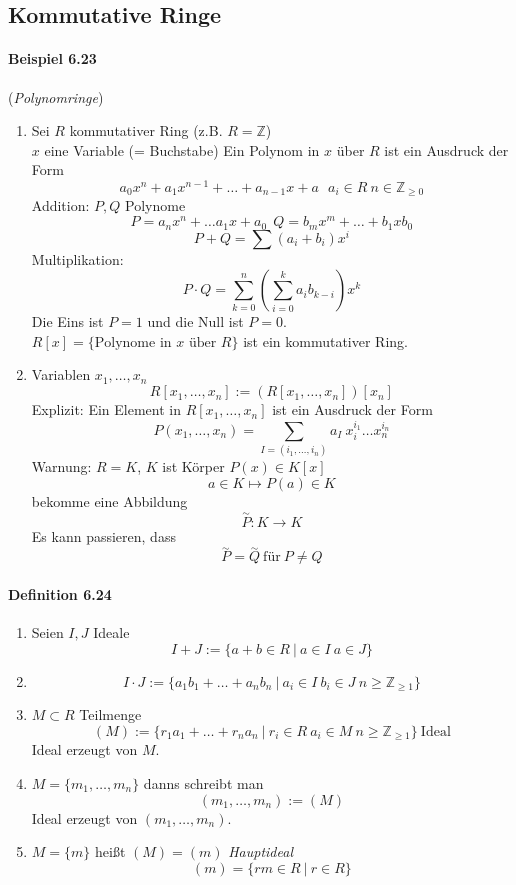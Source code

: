 \documentclass{scrartcl}
\begin{document}
\subsection{Kommutative Ringe}
\label{subsec:kommutativeringe}

\paragraph{Beispiel 6.23} (\textit{Polynomringe})
\begin{enumerate}
\item Sei $R$ kommutativer Ring (z.B. $R = \mathbb{Z}$) \\
  $x$ eine Variable (= Buchstabe)
  Ein Polynom in $x$ über $R$ ist ein Ausdruck der Form
  \[
    a_0x^n + a_1x^{n-1} + \dots + a_{n-1}x + a~~~a_i \in R~n \in
    \mathbb{Z}_{\geq 0}
  \]
  Addition: $P, Q$ Polynome
  \[
    P = a_nx^n + \dots a_{1}x+a_0 ~~
    Q = b_mx^m + \dots + b_{1}xb_0
  \]
  \[
     P + Q = \sum (a_i + b_i)x^i
   \]
   Multiplikation:
   \[
     P \cdot Q = \sum_{k = 0}^n \left( \sum_{i = 0}^k a_ib_{k - i} \right)x^k
   \]
   Die Eins ist $P = 1$ und die Null ist $P = 0$. \\
   $R[x] = \{\text{Polynome in $x$ über $R$}\}$ ist ein kommutativer Ring.

 \item Variablen $x_1, \dots, x_n$
   \[
     R[x_1, \dots, x_n] := \left(R[x_1, \dots, x_n]\right)[x_n]
   \]
   Explizit: Ein Element in $R[x_1, \dots, x_n]$ ist ein Ausdruck der Form
   \[
     P(x_1, \dots , x_n) = \sum_{I = (i_1, \dots, i_n)} a_I~x_i^{i_1} \dots x_n^{i_n}
   \]
   Warnung: $R = K$, $K$ ist Körper $P(x) \in K[x]$
   \[
     a \in K \mapsto P(a) \in K
   \]
   bekomme eine Abbildung
   \[
     \overset{\sim}{P}: K \to K
   \]
   Es kann passieren, dass
   \[
     \overset{\sim}{P} = \overset{\sim}{Q} ~\text{für} ~ P \neq Q
   \]
\end{enumerate}

\paragraph{Definition 6.24}
\begin{enumerate}
\item Seien $I,J$ Ideale
  \[
    I + J := \{a + b \in R ~|~ a \in I~a \in J\}
  \]
\item
  \[
    I \cdot J := \{a_1b_1 + \dots + a_nb_n ~|~ a_i \in I~ b_i \in J~n \geq
    \mathbb{Z}_{\geq 1}\}
  \]
\item $M \subset R$ Teilmenge
  \[
    (M) := \{r_1a_1 + \dots + r_na_n ~|~ r_i \in R~ a_i \in M ~ n \geq
    \mathbb{Z}_{\geq 1}\} ~\text{Ideal}
  \]
  Ideal erzeugt von $M$.
\item $M = \{m_1, \dots, m_n\}$ danns schreibt man
  \[
    (m_1, \dots, m_n) := (M)
  \]
  Ideal erzeugt von $(m_1, \dots, m_n)$.
\item $M = \{m\}$ heißt $(M) = (m)$ \textit{Hauptideal}
  \[
    (m) = \{rm \in R ~|~ r \in R\}
  \]
\end{enumerate}
\end{document}
